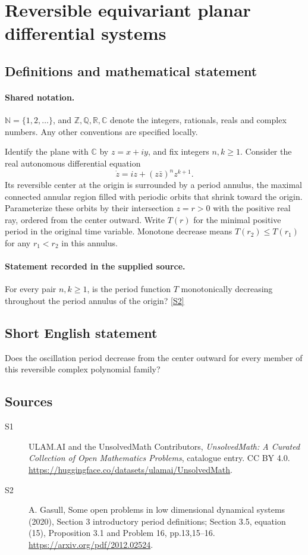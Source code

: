 \documentclass[11pt]{article}
\newcommand{\sref}[2]{\hyperlink{source:#1:#2}{[S#2]}}
\begin{document}
\section{Reversible equivariant planar differential systems}\label{statement}

\subsection{Definitions and mathematical statement}

\paragraph{Shared notation.}$\mathbb N=\{1,2,\ldots\}$, and $\mathbb Z,\mathbb Q,\mathbb R,\mathbb C$ denote the integers, rationals, reals and complex numbers. Any other conventions are specified locally.


Identify the plane with $\mathbb C$ by $z=x+iy$, and fix integers $n,k\ge1$. Consider the real autonomous differential equation \[\dot z=iz+(z\bar z)^n z^{k+1}.\] Its reversible center at the origin is surrounded by a period annulus, the maximal connected annular region filled with periodic orbits that shrink toward the origin. Parameterize these orbits by their intersection $z=r>0$ with the positive real ray, ordered from the center outward. Write $T(r)$ for the minimal positive period in the original time variable. Monotone decrease means $T(r_2)\le T(r_1)$ for any $r_1<r_2$ in this annulus.
\paragraph{Statement recorded in the supplied source.}
For every pair $n,k\ge1$, is the period function $T$ monotonically decreasing throughout the period annulus of the origin? \sref{statement}{2}
\subsection{Short English statement}
Does the oscillation period decrease from the center outward for every member of this reversible complex polynomial family?
\subsection{Sources}
\begin{description}
\item[\hypertarget{source:statement:1}{S1}] ULAM.AI and the UnsolvedMath Contributors, \emph{UnsolvedMath: A Curated Collection of Open Mathematics Problems}, catalogue entry. CC BY 4.0. \url{https://huggingface.co/datasets/ulamai/UnsolvedMath}.
\item[\hypertarget{source:statement:2}{S2}] A. Gasull, Some open problems in low dimensional dynamical systems (2020), Section 3 introductory period definitions; Section 3.5, equation (15), Proposition 3.1 and Problem 16, pp.13,15--16. \url{https://arxiv.org/pdf/2012.02524}.
\end{description}
\label{end:statement}
\end{document}
